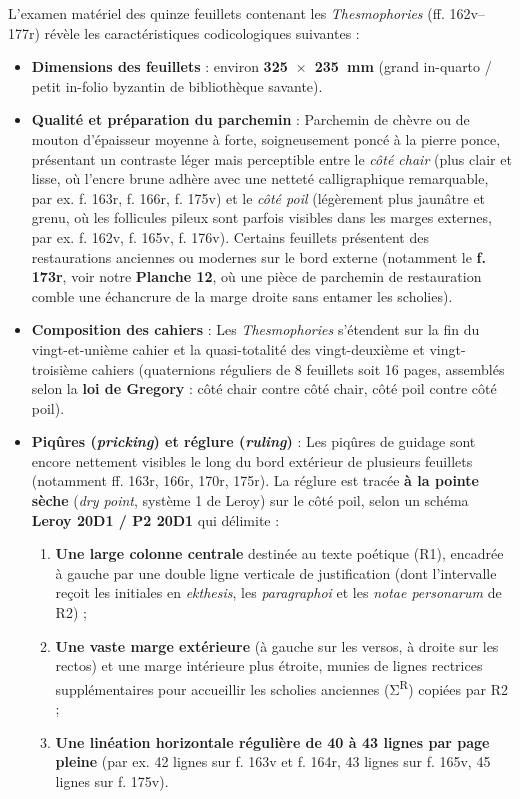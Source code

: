 \documentclass[11pt, a4paper, twoside]{article}
\renewcommand{\_}{\origunderscore\penalty0\relax}
\renewcommand{\texttt}[1]{#1}
\newcommand{\Run}{\textbf{R}\textsuperscript{1}}
\newcommand{\Rdeux}{\textbf{R}\textsuperscript{2}}
\def\Run{R1}%
\def\Rdeux{R2}%
\begin{document}
L'examen matériel des quinze feuillets contenant les \textit{Thesmophories} (\texttt{ff. 162v–177r}) révèle les caractéristiques codicologiques suivantes :
\begin{itemize}[leftmargin=1.5em, itemsep=2pt]
  \item \textbf{Dimensions des feuillets} : environ \textbf{325~$\times$~235~mm} (grand in-quarto / petit in-folio byzantin de bibliothèque savante).
  \item \textbf{Qualité et préparation du parchemin} : Parchemin de chèvre ou de mouton d'épaisseur moyenne à forte, soigneusement poncé à la pierre ponce, présentant un contraste léger mais perceptible entre le \textit{côté chair} (plus clair et lisse, où l'encre brune adhère avec une netteté calligraphique remarquable, par ex. \texttt{f. 163r}, \texttt{f. 166r}, \texttt{f. 175v}) et le \textit{côté poil} (légèrement plus jaunâtre et grenu, où les follicules pileux sont parfois visibles dans les marges externes, par ex. \texttt{f. 162v}, \texttt{f. 165v}, \texttt{f. 176v}). Certains feuillets présentent des restaurations anciennes ou modernes sur le bord externe (notamment le \textbf{\texttt{f. 173r}}, voir notre \textbf{Planche 12}, où une pièce de parchemin de restauration comble une échancrure de la marge droite sans entamer les scholies).
  \item \textbf{Composition des cahiers} : Les \textit{Thesmophories} s'étendent sur la fin du vingt-et-unième cahier et la quasi-totalité des vingt-deuxième et vingt-troisième cahiers (quaternions réguliers de 8 feuillets soit 16 pages, assemblés selon la \textbf{loi de Gregory} : côté chair contre côté chair, côté poil contre côté poil).
  \item \textbf{Piqûres (\textit{pricking}) et réglure (\textit{ruling})} : Les piqûres de guidage sont encore nettement visibles le long du bord extérieur de plusieurs feuillets (notamment \texttt{ff. 163r, 166r, 170r, 175r}). La réglure est tracée \textbf{à la pointe sèche} (\textit{dry point}, système 1 de Leroy) sur le côté poil, selon un schéma \textbf{Leroy 20D1 / P2 20D1} qui délimite :
  \begin{enumerate}[leftmargin=1.6em, itemsep=2pt]
    \item \textbf{Une large colonne centrale} destinée au texte poétique (\Run{}), encadrée à gauche par une double ligne verticale de justification (dont l'intervalle reçoit les initiales en \textit{ekthesis}, les \textit{paragraphoi} et les \textit{notae personarum} de \Rdeux{}) ;
    \item \textbf{Une vaste marge extérieure} (à gauche sur les versos, à droite sur les rectos) et une marge intérieure plus étroite, munies de lignes rectrices supplémentaires pour accueillir les scholies anciennes (Σ\textsuperscript{R}) copiées par \Rdeux{} ;
    \item \textbf{Une linéation horizontale régulière de 40 à 43 lignes par page pleine} (par ex. 42 lignes sur \texttt{f. 163v} et \texttt{f. 164r}, 43 lignes sur \texttt{f. 165v}, 45 lignes sur \texttt{f. 175v}).
  \end{enumerate}
\end{itemize}
\end{document}
